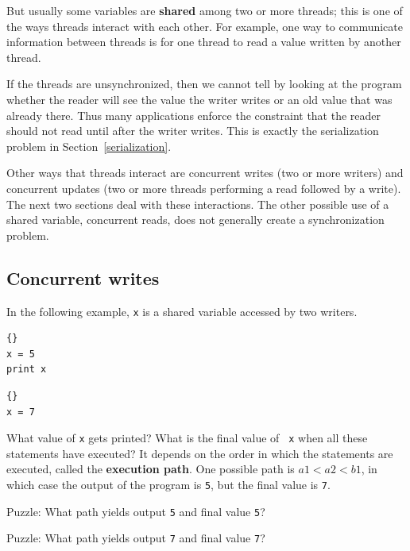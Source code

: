\documentclass{book}
\begin{document}
But usually some variables are {\bf shared} among two or more
threads; this is one of the ways threads interact with each other.
For example, one way to communicate information between threads is
for one thread to read a value written by another thread.

If the threads are unsynchronized, then we cannot tell by looking at
the program whether the reader will see the value the writer writes
or an old value that was already there.
Thus many applications enforce the constraint that the reader
should not read until after the writer writes.  This is exactly
the serialization problem in Section~\ref{serialization}.

Other ways that threads interact are
concurrent writes (two or more writers) and concurrent updates
(two or more threads performing a read followed by a write).
The next two sections deal with these interactions.  The other
possible use of a shared variable, concurrent
reads, does not generally create a synchronization problem.


\subsection {Concurrent writes}

In the following example, {\tt x} is a shared variable accessed
by two writers.

\noindent\begin{minipage}[t]{0.4\textwidth}
    \begin{lstlisting}[title={Thread A}]{}
x = 5
print x
\end{lstlisting}
\end{minipage}
\hfill
\noindent\begin{minipage}[t]{0.4\textwidth}
    \begin{lstlisting}[title={Thread B}]{}
x = 7
\end{lstlisting}
\end{minipage}

What value of {\tt x} gets printed?  What is the final value of {\tt
        x} when all these statements have executed?  It depends on the order
in which the statements are executed, called the {\bf execution path}.
One possible path is $a1 < a2 < b1$, in which case the output of the
program is {\tt 5}, but the final value is {\tt 7}.

Puzzle: What path yields output {\tt 5} and final
value {\tt 5}?

Puzzle: What path yields output {\tt 7} and final
value {\tt 7}?
\end{document}
